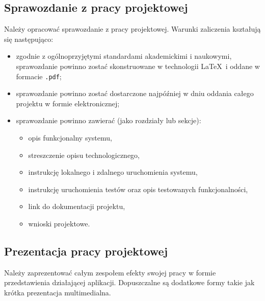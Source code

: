 \documentclass{article}
\begin{document}
	\subsection{Sprawozdanie z pracy projektowej}
	Należy opracować sprawozdanie z pracy projektowej. Warunki zaliczenia kształują się następująco:
	\begin{itemize}
		\item zgodnie z ogólnoprzyjętymi standardami akademickimi i naukowymi, sprawozdanie powinno zostać skonstruowane w technologii \LaTeX \ i oddane w formacie \texttt{.pdf};
		\item sprawozdanie powinno zostać dostarczone najpóźniej w dniu oddania całego projektu w formie elektronicznej;
		\item sprawozdanie powinno zawierać (jako rozdziały lub sekcje):
		\begin{itemize}
			\item opis funkcjonalny systemu,
			\item streszczenie opisu technologicznego,
			\item instrukcję lokalnego i zdalnego uruchomienia systemu,
			\item instrukcję uruchomienia testów oraz opis testowanych funkcjonalności,
			\item link do dokumentacji projektu,
			\item wnioski projektowe.
		\end{itemize}
	\end{itemize}	
	
	\subsection{Prezentacja pracy projektowej}
	Należy zaprezentować całym zespołem efekty swojej pracy w formie przedstawienia działającej aplikacji. Dopuszczalne są dodatkowe formy takie jak krótka prezentacja multimedialna.
	
\end{document}
